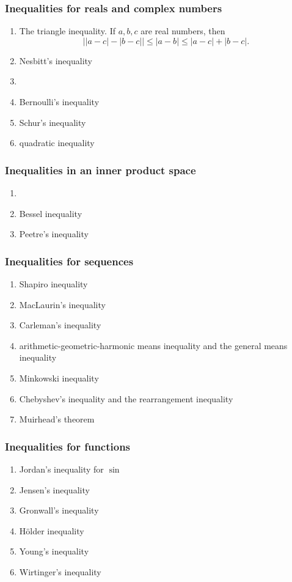 \documentclass[12pt]{article}
\begin{document}
\subsubsection*{Inequalities for reals and complex numbers}
\begin{enumerate}
\item The triangle inequality. If $a,b,c$ are real numbers, then 
$$\bigl| |a-c| - |b-c| \bigr| \le |a-b| \le |a-c| + |b-c|.$$
\item Nesbitt's inequality
\item {}
\item Bernoulli's inequality 
\item Schur's inequality 
\item quadratic inequality
\end{enumerate}

\subsubsection*{Inequalities in an inner product space}
\begin{enumerate}
\item {}
\item Bessel inequality
\item Peetre's inequality
\end{enumerate}

\subsubsection*{Inequalities for sequences}
\begin{enumerate}
\item Shapiro inequality
\item MacLaurin's inequality 
\item Carleman's inequality
\item arithmetic-geometric-harmonic means inequality and 
the general means inequality 
\item Minkowski inequality
\item Chebyshev's inequality 
and the rearrangement inequality
\item Muirhead's theorem
\end{enumerate}

\subsubsection*{Inequalities for functions}
\begin{enumerate}
\item Jordan's inequality for $\sin$
\item Jensen's inequality
\item Gronwall's inequality
\item H\"older inequality
\item Young's inequality
\item Wirtinger's inequality
\end{enumerate}
\end{document}
